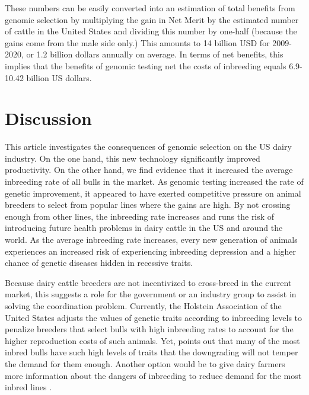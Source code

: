 \documentclass[12pt,letterpaper]{article}
\begin{document}
These numbers can be easily converted into an estimation of total benefits from genomic selection by multiplying the gain in Net Merit by the estimated number of cattle in the United States and dividing this number by one-half (because the gains come from the male side only.) 
This amounts to 14 billion USD for 2009-2020, or 1.2 billion dollars annually on average. 
In terms of net benefits, this implies that the benefits of genomic testing net the costs of inbreeding equals 6.9-10.42 billion US dollars.



\section{Discussion\label{sec:discussion}}
This article investigates the consequences of genomic selection on the US dairy industry. On the one hand, this new technology significantly improved productivity. 
On the other hand, we find evidence that it increased the average inbreeding rate of all bulls in the market. As genomic testing increased the rate of genetic improvement, it appeared to have exerted competitive pressure on animal breeders to select from popular lines where the gains are high.
By not crossing enough from other lines, the inbreeding rate increases and runs the risk of introducing future health problems in dairy cattle in the US and around the world.
As the average inbreeding rate increases, every new generation of animals experiences an increased risk of experiencing inbreeding depression and a higher chance of genetic diseases hidden in recessive traits.

Because dairy cattle breeders are not incentivized to cross-breed in the current market, this suggests a role for the government or an industry group to assist in solving the coordination problem.
Currently, the Holstein Association of the United States adjusts the values of genetic traits according to inbreeding levels to penalize breeders that select bulls with high inbreeding rates to account for the higher reproduction costs of such animals. 
Yet, \citet{Cole2023} points out that many of the most inbred bulls have such high levels of traits that the downgrading will not temper the demand for them enough.
Another option would be to give dairy farmers more information about the dangers of inbreeding to reduce demand for the most inbred lines \citep{Cole2023}.
\end{document}
